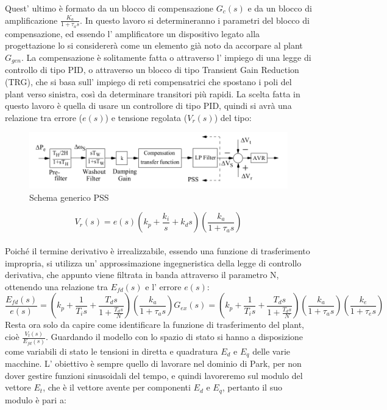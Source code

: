 \documentclass[Lau,noexaminfo]{sapthesis}
\begin{document}
	Quest' ultimo è formato da un blocco di compensazione $G_c(s)$ e da un blocco di amplificazione $\frac{K_a}{1+\tau_as}$. In questo lavoro si determineranno i parametri del blocco di compensazione, ed essendo l' amplificatore un dispositivo legato alla progettazione lo si considererà come un elemento già noto da accorpare al plant $G_{gen}$. La compensazione è solitamente fatta o attraverso l' impiego di una legge di controllo di tipo PID, o attraverso un blocco di tipo Transient Gain Reduction (TRG), che si basa sull' impiego di reti compensatrici che spostano i poli del plant verso sinistra, così da determinare transitori più rapidi. La scelta fatta in questo lavoro è quella di usare un controllore di tipo PID, quindi si avrà una relazione tra errore ($e(s)$) e tensione regolata ($V_r(s)$) del tipo:
	\begin{figure}
		\centering
		\includegraphics[height=0.13\textheight]{PSS}
		\caption{Schema generico PSS}
	\end{figure}
	\begin{equation*}
	V_r(s)=e(s)(k_p+\frac{k_i}{s}+k_ds)(\frac{k_a}{1+\tau_as})
	\end{equation*}\\
	Poiché il termine derivativo è irrealizzabile, essendo una funzione di trasferimento impropria, si utilizza un' approssimazione ingegneristica della legge di controllo derivativa, che appunto viene filtrata in banda attraverso il parametro N, ottenendo una relazione tra $E_{fd}(s)$ e l' errore $e(s)$:\\
	\begin{equation*}
	\frac{E_{fd}(s)}{e(s)}=(k_p+\frac{1}{T_is}+\frac{T_ds}{1+\frac{T_d s}{N}})(\frac{k_a}{1+\tau_as})G_{ex}(s)=(k_p+\frac{1}{T_is}+\frac{T_ds}{1+\frac{T_d s}{N}})(\frac{k_a}{1+\tau_as})(\frac{k_e}{1+\tau_es})
	\end{equation*}
	Resta ora solo da capire come identificare la funzione di trasferimento del plant, cioè $\frac{V_t(s)}{E_{fd}(s)}$. Guardando il modello con lo spazio di stato si hanno a disposizione come variabili di stato le tensioni in diretta e quadratura $E_d$ e $E_q$ delle varie macchine. L' obiettivo è sempre quello di lavorare nel dominio di Park, per non dover gestire funzioni sinusoidali del tempo, e quindi lavoreremo sul modulo del vettore $E_t$, che è il vettore avente per componenti $E_d$ e $E_q$, pertanto il suo modulo è pari a:
\end{document}
